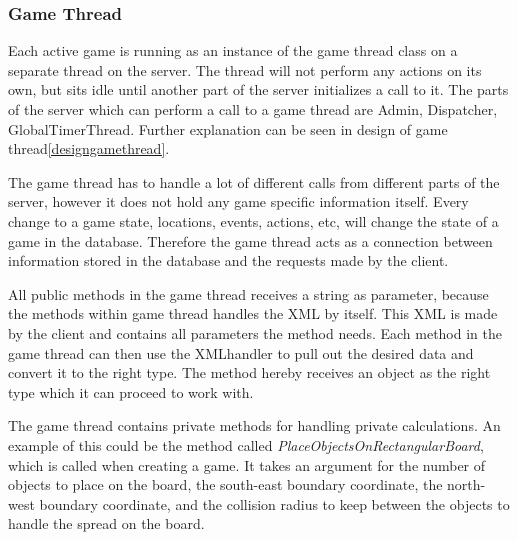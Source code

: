 \subsubsection{Game Thread}
\label{sec:gamethreadimpl}
Each active game is running as an instance of the game thread class on a separate thread on the server. The thread will not perform any actions on its own, but sits idle until another part of the server initializes a call to it. The parts of the server which can perform a call to a game thread are Admin, Dispatcher, GlobalTimerThread. Further explanation can be seen in design of game thread\ref{designgamethread}. 

The game thread has to handle a lot of different calls from different parts of the server, however it does not hold any game specific information itself. Every change to a game state, locations, events, actions, etc, will change the state of a game in the database. Therefore the game thread acts as a connection between information stored in the database and the requests made by the client.

All public methods in the game thread receives a string as parameter, because the methods within game thread handles the XML by itself. This XML is made by the client and contains all parameters the method needs. Each method in the game thread can then use the XMLhandler to pull out the desired data and convert it to the right type. The method hereby receives an object as the right type which it can proceed to work with.

The game thread contains private methods for handling private calculations. An example of this could be the method called \textit{PlaceObjectsOnRectangularBoard}, which is called when creating a game. It takes an argument for the number of objects to place on the board, the south-east boundary coordinate, the north-west boundary coordinate, and the collision radius to keep between the objects to handle the spread on the board. 


